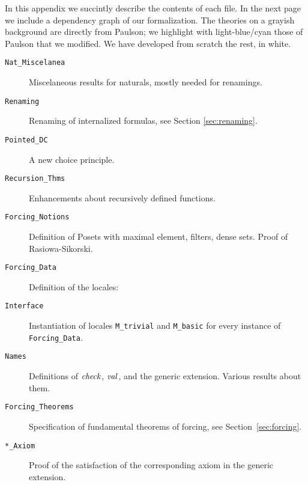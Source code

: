 In this appendix we succintly describe the contents of each file. In
the next page we include a dependency graph of our formalization. The
theories on a grayish background are directly from Paulson; we
highlight with light-blue/cyan those of Paulson that we modified. We
have developed from scratch the rest, in white.

\begin{description}
\item[\texttt{Nat\_Miscelanea}]Miscelaneous results for naturals, mostly
  needed for renamings.
\item[\texttt{Renaming}] Renaming of internalized formulas, see
  Section \ref{sec:renaming}.
\item[\texttt{Pointed\_DC}] A new choice principle.
\item[\texttt{Recursion\_Thms}] Enhancements about recursively defined
  functions.
\item[\texttt{Forcing\_Notions}] Definition of Posets with maximal
  element, filters, dense sets. Proof of Rasiowa-Sikorski.
\item[\texttt{Forcing\_Data}] Definition of the locales:
\item[\texttt{Interface}] Instantiation of locales \texttt{M\_trivial}
  and \texttt{M\_basic} for every instance of \texttt{Forcing\_Data}.
\item[\texttt{Names}] Definitions of $\operatorname{\mathit{check}}$, $\operatorname{\mathit{val}}$, and the generic
  extension. Various results about them.
\item[\texttt{Forcing\_Theorems}] Specification of fundamental
  theorems of forcing, see Section~\ref{sec:forcing}.
\item[\texttt{*\_Axiom}] Proof of the satisfaction of the
  corresponding axiom in the generic extension.
\end{description}




